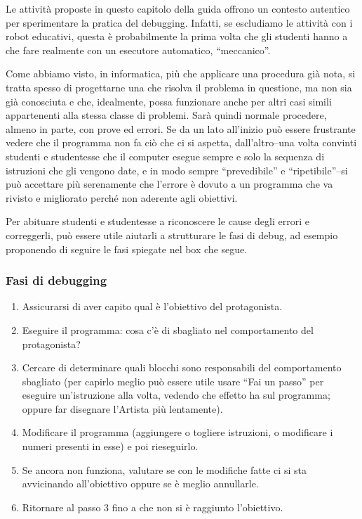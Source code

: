 Le attività proposte in questo capitolo della guida offrono un contesto autentico per sperimentare la pratica del debugging. Infatti, se escludiamo le attività con i robot educativi, questa è probabilmente la prima volta che gli studenti hanno a che fare realmente con un esecutore automatico, ``meccanico''.

Come abbiamo visto, in informatica, più che applicare una procedura già nota, si tratta spesso di progettarne una che risolva il problema in questione, ma non sia già conosciuta e che, idealmente, possa funzionare anche per altri casi simili appartenenti alla stessa classe di problemi. Sarà quindi normale procedere, almeno in parte, con prove ed errori. Se da un lato all'inizio può essere frustrante vedere che il programma non fa ciò che ci si aspetta, dall'altro--una volta convinti studenti e studentesse che il computer esegue sempre e solo la sequenza di istruzioni che gli vengono date, e in modo sempre ``prevedibile'' e ``ripetibile''--si può accettare più serenamente che l'errore è dovuto a un programma che va rivisto e migliorato perché non aderente agli obiettivi.

Per abituare studenti e studentesse a riconoscere le cause degli errori e correggerli, può essere utile aiutarli a strutturare le fasi di debug, ad esempio proponendo di seguire le fasi spiegate nel box che segue.

\subsubsection{Fasi di debugging}

\begin{enumerate}
\def\labelenumi{\arabic{enumi}.}
\item
  Assicurarsi di aver capito qual è l'obiettivo del protagonista.
\item
  Eseguire il programma: cosa c'è di sbagliato nel comportamento del protagonista?
\item
  Cercare di determinare quali blocchi sono responsabili del comportamento sbagliato (per capirlo meglio può essere utile usare ``Fai un passo'' per eseguire un'istruzione alla volta, vedendo che effetto ha sul programma; oppure far disegnare l'Artista più lentamente).
\item
  Modificare il programma (aggiungere o togliere istruzioni, o modificare i numeri presenti in esse) e poi rieseguirlo.
\item
  Se ancora non funziona, valutare se con le modifiche fatte ci si sta avvicinando all'obiettivo oppure se è meglio annullarle.
\item
  Ritornare al passo 3 fino a che non si è raggiunto l'obiettivo.
\end{enumerate}

